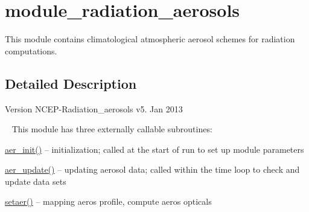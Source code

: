 \hypertarget{group__module__radiation__aerosols}{}\section{module\+\_\+radiation\+\_\+aerosols}
\label{group__module__radiation__aerosols}


This module contains climatological atmospheric aerosol schemes for radiation computations.  




\subsection{Detailed Description}
\begin{DoxyVersion}{Version}
N\+C\+E\+P-\/\+Radiation\+\_\+aerosols v5. Jan 2013
\end{DoxyVersion}
~\newline
 This module has three externally callable subroutines\+:
\begin{DoxyItemize}
\item \hyperlink{group__module__radiation__aerosols_ga58ac70a5189ef62c63cf2c87465a030a}{aer\+\_\+init()} -- initialization; called at the start of run to set up module parameters
\item \hyperlink{group__module__radiation__aerosols_ga237071d2a0691d5aae199937d9b6aca5}{aer\+\_\+update()} -- updating aerosol data; called within the time loop to check and update data sets
\item \hyperlink{group__module__radiation__aerosols_ga184fcc0618c1c4d42fa08cfe1e20e5c1}{setaer()} -- mapping aeros profile, compute aeros opticals
\end{DoxyItemize}

